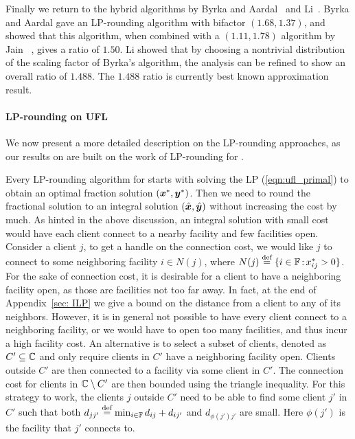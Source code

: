 \documentclass[oneside,final]{ucr}
\begin{document}
Finally we return to the hybrid algorithms by Byrka and
Aardal~\cite{ByrkaA10} and Li~\cite{Li11}. Byrka and Aardal
gave an LP-rounding algorithm with bifactor $(1.68,1.37)$,
and showed that this algorithm, when combined with a
$(1.11,1.78)$ algorithm by Jain {\etal}~\cite{JainMMSV03},
gives a ratio of $1.50$. Li showed that by choosing a
nontrivial distribution of the scaling factor of Byrka's
algorithm, the analysis can be refined to show an overall
ratio of $1.488$. The $1.488$ ratio is currently best known
approximation result.

\paragraph{LP-rounding on UFL}
We now present a more detailed description on the
LP-rounding approaches, as our results on {\FTFP} are built
on the work of LP-rounding for {\UFL}.

Every LP-rounding algorithm for {\UFL} starts with solving
the LP (\ref{eqn:ufl_primal}) to obtain an optimal fraction
solution $(\boldsymbol{x}^\ast,\boldsymbol{y}^\ast)$. Then we need to round the
fractional solution to an integral solution
$(\hat{\boldsymbol{x}},\hat{\boldsymbol{y}})$ without increasing the cost by
much. As hinted in the above discussion, an integral
solution with small cost would have each client connect to a
nearby facility and few facilities open. Consider a client
$j$, to get a handle on the connection cost, we would like
$j$ to connect to some neighboring facility $i\in N(j)$,
where $N(j) \stackrel{\text{def}}{=} \{i\in\mathbb{F} {\,:\,} x_{ij}^\ast >
0\}$. For the sake of connection cost, it is desirable for a
client to have a neighboring facility open, as those are
facilities not too far away. In fact, at the end of
Appendix~\ref{sec: ILP} we give a bound on the distance from
a client to any of its neighbors. However, it is in general
not possible to have every client connect to a neighboring
facility, or we would have to open too many facilities, and
thus incur a high facility cost. An alternative is to select
a subset of clients, denoted as $C' \subseteq \mathbb{C}$
and only require clients in $C'$ have a neighboring facility
open. Clients outside $C'$ are then connected to a facility
via some client in $C'$. The connection cost for clients in
$\mathbb{C} \setminus C'$ are then bounded using the
triangle inequality. For this strategy to work, the clients
$j$ outside $C'$ need to be able to find some client $j'$ in
$C'$ such that both $d_{jj'} \stackrel{\text{def}}{=} \min_{i\in \mathbb{F}}
d_{ij} + d_{ij'}$ and $d_{\phi(j') j'}$ are small. Here
$\phi(j')$ is the facility that $j'$ connects to.
\end{document}
